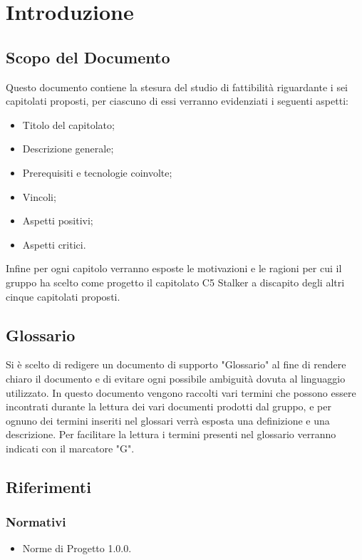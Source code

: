\section{Introduzione}
\subsection{Scopo del Documento}
Questo documento contiene la stesura del studio di fattibilità riguardante i sei capitolati proposti, per ciascuno di essi verranno evidenziati i seguenti aspetti:
\begin{itemize}
\item Titolo del capitolato;
\item Descrizione generale;
\item Prerequisiti e tecnologie coinvolte;
\item Vincoli;
\item Aspetti positivi;
\item Aspetti critici.
\end{itemize}
Infine per ogni capitolo verranno esposte le motivazioni e le ragioni per cui il gruppo ha scelto come progetto il capitolato C5 Stalker a discapito degli altri cinque capitolati proposti.

\subsection{Glossario}
Si è scelto di redigere un documento di supporto "Glossario" al fine di rendere chiaro il documento e di evitare ogni possibile ambiguità dovuta al linguaggio utilizzato. In questo documento vengono raccolti vari termini che possono essere incontrati durante la lettura dei vari documenti prodotti dal gruppo, e per ognuno dei termini inseriti nel glossari  verrà esposta una definizione e una descrizione. Per facilitare la lettura i termini presenti nel glossario verranno indicati con il marcatore "G".
	
\subsection{Riferimenti}

\subsubsection{Normativi}
\begin{itemize}
\item Norme di Progetto 1.0.0.
\end{itemize}

